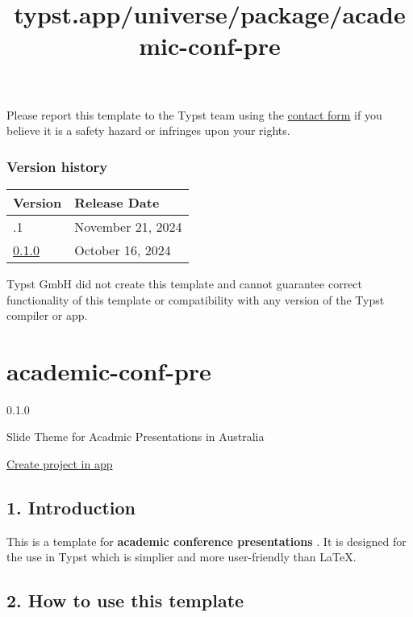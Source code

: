 Please report this template to the Typst team using the
\href{https://typst.app/contact}{contact form} if you believe it is a
safety hazard or infringes upon your rights.

\label{versions}
\subsubsection{Version history}\label{version-history}

\begin{longtable}[]{@{}ll@{}}
\toprule\noalign{}
Version & Release Date \\
\midrule\noalign{}
\endhead
\bottomrule\noalign{}
\endlastfoot
0.1.1 & November 21, 2024 \\
\href{https://typst.app/universe/package/silky-slides-insa/0.1.0/}{0.1.0}
& October 16, 2024 \\
\end{longtable}

Typst GmbH did not create this template and cannot guarantee correct
functionality of this template or compatibility with any version of the
Typst compiler or app.


\title{typst.app/universe/package/academic-conf-pre}

\label{banner}
\label{template-thumbnail}

\section{academic-conf-pre}\label{academic-conf-pre}

{ 0.1.0 }

Slide Theme for Acadmic Presentations in Australia

\href{/app?template=academic-conf-pre&version=0.1.0}{Create project in
app}

\label{readme}
\subsection{1. Introduction}\label{introduction}

This is a template for \textbf{academic conference presentations} . It
is designed for the use in Typst which is simplier and more
user-friendly than LaTeX.

\subsection{2. How to use this template}\label{how-to-use-this-template}

